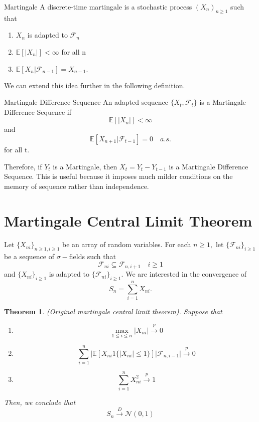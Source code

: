 \documentclass[twoside]{article}
\newcounter{lecnum}
\newtheorem{theorem}{Theorem}[lecnum]
\newcommand{\sigmalgebra}{\mathcal{F}}
\begin{document}
\begin{definition_exam}{Martingale}{} A discrete-time martingale is a stochastic process $(X_n)_{n \geq 1}$ such that
\begin{enumerate}
  \item $X_n$ is adapted to $\mathcal{F}_n$
  \item $\mathbb{E}[|X_n|] < \infty$ for all n 
  \item $\mathbb{E}[X_n|\mathcal{F}_{n - 1}] = X_{n - 1}.$
\end{enumerate}
\end{definition_exam}

We can extend this idea further in the following definition.
\begin{definition_exam}{Martingale Difference Sequence}{} An adapted sequence $\{X_t, \sigmalgebra_t\}$ is a Martingale Difference Sequence if 
$$
\mathbb{E}[|X_n|] < \infty
$$
and 
$$
\mathbb{E}[X_{n + 1}|\sigmalgebra_{t-1}] = 0 \quad a.s.
$$
for all t.
\end{definition_exam}

Therefore, if $Y_t$ is a Martingale, then $X_t = Y_t - Y_{t-1}$ is a Martingale Difference Sequence. This is useful because it imposes much milder conditions on the memory of sequence rather than independence. 

\section{Martingale Central Limit Theorem}

Let $\{X_{ni}\}_{n \geq 1, i \geq 1}$ be an array of random variables. For each $n \geq 1,$ let $\{\mathcal{F}_{ni}\}_{i \geq 1}$ be a sequence of $\sigma-$fields such that 
$$
\mathcal{F}_{ni} \subseteq \mathcal{F}_{n,i+1} \quad i \geq 1
$$
and $\{X_{ni}\}_{i \geq 1}$ is adapted to $\{\mathcal{F}_{ni}\}_{i \geq 1}.$ We are interested in the convergence of 
$$
S_n = \sum_{i=1}^{n}X_{ni}.
$$

\begin{theorem} (Original martingale central limit theorem). Suppose that 
\begin{enumerate}
\item
\begin{equation}
\max_{1 \leq i \leq n}|X_{ni}| \xrightarrow{p} 0
\end{equation}
\item 
\begin{equation}
\sum_{i=1}^{n}\bigg|\mathbb{E}[X_{ni}1\{|X_{ni}| \leq 1\}] \big| \mathcal{F}_{n, i-1} \bigg| \xrightarrow{p} 0
\end{equation}
\item 
\begin{equation}
\sum_{i=1}^{n}X_{ni}^{2} \xrightarrow{p} 1
\end{equation}
\end{enumerate}
Then, we conclude that 
$$
S_n \xrightarrow{D} \mathcal{N}(0, 1)
$$
\end{theorem}
\end{document}
